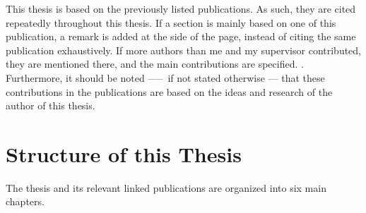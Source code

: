 This thesis is based on the previously listed publications. As such, they are cited repeatedly throughout this thesis. If a section is mainly based on one of this publication, a remark is added at the side of the page, instead of citing the same publication exhaustively. If more authors than me and my supervisor contributed, they are mentioned there, and the main contributions are specified.
. Furthermore, it should be noted ––– if not stated otherwise ---  that these contributions in the publications are based on the ideas and research of the author of this thesis.

\section{Structure of this Thesis}

The thesis and its relevant linked publications are organized into six main chapters.
